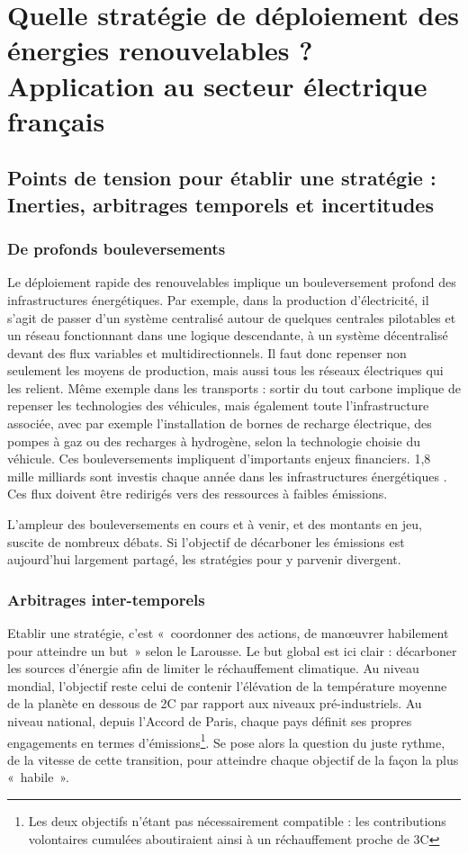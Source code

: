 \section{Quelle stratégie de déploiement des énergies renouvelables ? Application au secteur électrique français}

\label{sec:intro_renouvelables}

\subsection{Points de tension pour établir une stratégie : Inerties, arbitrages temporels et incertitudes}
\subsubsection{De profonds bouleversements}
Le déploiement rapide des renouvelables implique un bouleversement profond des infrastructures énergétiques. Par exemple, dans la production d’électricité, il s’agit de passer d’un système centralisé autour de quelques centrales pilotables et un réseau fonctionnant dans une logique descendante, à un système décentralisé devant des flux variables et multidirectionnels. Il faut donc repenser non seulement les moyens de production, mais aussi tous les réseaux électriques qui les relient.
Même exemple dans les transports : sortir du tout carbone implique de repenser les technologies des véhicules, mais également toute l’infrastructure associée, avec par exemple l’installation de bornes de recharge électrique, des pompes à gaz ou des recharges à hydrogène, selon la technologie choisie du véhicule.
Ces bouleversements impliquent d’importants enjeux financiers. 1,8 mille milliards sont investis chaque année dans les infrastructures énergétiques \citep{IEAWIR2016}. Ces flux doivent être redirigés vers des ressources à faibles émissions. 

L’ampleur des bouleversements en cours et à venir, et des montants en jeu, suscite de nombreux débats. Si l’objectif de décarboner les émissions est aujourd’hui largement partagé, les stratégies pour y parvenir divergent. 

\subsubsection{Arbitrages inter-temporels}
Etablir une stratégie, c’est «~coordonner des actions, de manœuvrer habilement pour atteindre un but~» selon le Larousse. Le but global est ici clair : décarboner les sources d’énergie afin de limiter le réchauffement climatique. Au niveau mondial, l’objectif reste celui de contenir l’élévation de la température moyenne de la planète en dessous de 2\degree C par rapport aux niveaux pré-industriels. Au niveau national, depuis l’Accord de Paris, chaque pays définit ses propres engagements en termes d’émissions\footnote{Les deux objectifs n’étant pas nécessairement compatible : les contributions volontaires cumulées aboutiraient ainsi à un réchauffement proche de 3\degree C}. Se pose alors la question du juste rythme, de la vitesse de cette transition, pour atteindre chaque objectif de la façon la plus «~habile~».

